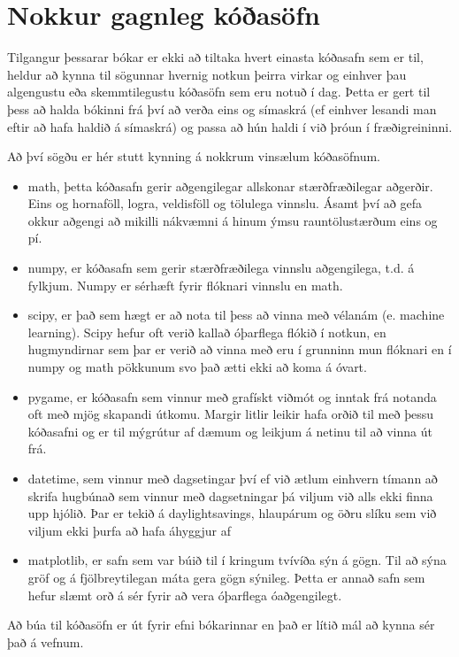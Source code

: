 \section{Nokkur gagnleg kóðasöfn}\label{uk:kóðasöfn-gagnleg}
Tilgangur þessarar bókar er ekki að tiltaka hvert einasta kóðasafn sem er til, heldur að kynna til sögunnar hvernig notkun þeirra virkar og einhver þau algengustu eða skemmtilegustu kóðasöfn sem eru notuð í dag.
Þetta er gert til þess að halda bókinni frá því að verða eins og símaskrá (ef einhver lesandi man eftir að hafa haldið á símaskrá) og passa að hún haldi í við þróun í fræðigreininni.

Að því sögðu er hér stutt kynning á nokkrum vinsælum kóðasöfnum.

\begin{itemize}
	\item math, þetta kóðasafn gerir aðgengilegar allskonar stærðfræðilegar aðgerðir.
	Eins og hornaföll, logra, veldisföll og tölulega vinnslu.
	Ásamt því að gefa okkur aðgengi að mikilli nákvæmni á hinum ýmsu rauntölustærðum eins og pí.
	\item numpy, er kóðasafn sem gerir stærðfræðilega vinnslu aðgengilega, t.d. á fylkjum.
	Numpy er sérhæft fyrir flóknari vinnslu en math.
	\item scipy, er það sem hægt er að nota til þess að vinna með vélanám (e. machine learning).
	Scipy hefur oft verið kallað óþarflega flókið í notkun, en hugmyndirnar sem þar er verið að vinna með eru í grunninn mun flóknari en í numpy og math pökkunum svo það ætti ekki að koma á óvart.
	\item pygame, er kóðasafn sem vinnur með grafískt viðmót og inntak frá notanda oft með mjög skapandi útkomu.
	Margir litlir leikir hafa orðið til með þessu kóðasafni og er til mýgrútur af dæmum og leikjum á netinu til að vinna út frá.
	\item datetime, sem vinnur með dagsetingar því ef við ætlum einhvern tímann að skrifa hugbúnað sem vinnur með dagsetningar þá viljum við alls ekki finna upp hjólið.
	Þar er tekið á daylightsavings, hlaupárum og öðru slíku sem við viljum ekki þurfa að hafa áhyggjur af
	\item matplotlib, er safn sem var búið til í kringum tvívíða sýn á gögn.
	Til að sýna gröf og á fjölbreytilegan máta gera gögn sýnileg.
	Þetta er annað safn sem hefur slæmt orð á sér fyrir að vera óþarflega óaðgengilegt.
\end{itemize}

Að búa til kóðasöfn er út fyrir efni bókarinnar en það er lítið mál að kynna sér það á vefnum.

